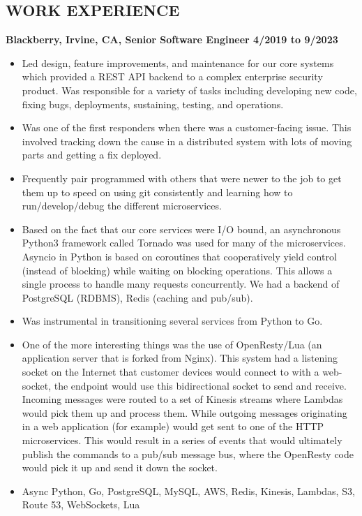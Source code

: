 \documentclass{res}
\begin{document}
\begin{resume}
\section{WORK EXPERIENCE}
  {\large \bf Blackberry, Irvine, CA, Senior Software Engineer \hfill 4/2019 to 9/2023}
  \begin{itemize}
  \item
    Led design, feature improvements, and maintenance for our core
    systems which provided a REST API backend to a complex enterprise
    security product.  Was responsible for a variety of tasks including
    developing new code, fixing bugs, deployments, sustaining, testing,
    and operations.
  \item
    Was one of the first responders when there was a customer-facing
    issue.  This involved tracking down the cause in a distributed system
    with lots of moving parts and getting a fix deployed.
  \item
    Frequently pair programmed with others that were newer to the job
    to get them up to speed on using git consistently and learning how
    to run/develop/debug the different microservices.
  \item
    Based on the fact that our core services were I/O bound, an
    asynchronous Python3 framework called Tornado was used for many of
    the microservices. Asyncio in Python is based on coroutines that
    cooperatively yield control (instead of blocking) while waiting on
    blocking operations. This allows a single process to handle many
    requests concurrently.  We had a backend of PostgreSQL (RDBMS),
    Redis (caching and pub/sub).
  \item
    Was instrumental in transitioning several services from Python to Go.
  \item
    One of the more interesting things was the use of OpenResty/Lua (an
    application server that is forked from Nginx).  This system had a
    listening socket on the Internet that customer devices would connect
    to with a web-socket, the endpoint would use this bidirectional
    socket to send and receive.  Incoming messages were routed to a set
    of Kinesis streams where Lambdas would pick them up and process them.
    While outgoing messages originating in a web application (for example)
    would get sent to one of  the HTTP microservices.  This would result
    in a series of events that would ultimately publish the commands
    to a pub/sub message bus, where the OpenResty code would pick it up
    and send it down the socket.
  \item
    Async Python, Go, PostgreSQL, MySQL, AWS, Redis, Kinesis, Lambdas, S3, Route 53, WebSockets, Lua
  \end{itemize}


\end{resume}
\end{document}
